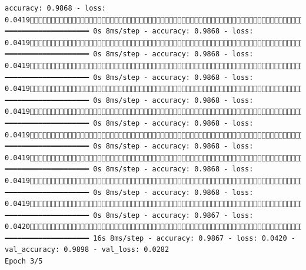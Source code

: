 \documentclass[
  letterpaper,
  DIV=11,
  numbers=noendperiod]{scrreprt}
\begin{document}
\begin{verbatim}
accuracy: 0.9868 - loss: 0.04191824/1875 ━━━━━━━━━━━━━━━━━━━━ 0s 8ms/step - accuracy: 0.9868 - loss: 0.04191830/1875 ━━━━━━━━━━━━━━━━━━━━ 0s 8ms/step - accuracy: 0.9868 - loss: 0.04191836/1875 ━━━━━━━━━━━━━━━━━━━━ 0s 8ms/step - accuracy: 0.9868 - loss: 0.04191842/1875 ━━━━━━━━━━━━━━━━━━━━ 0s 8ms/step - accuracy: 0.9868 - loss: 0.04191848/1875 ━━━━━━━━━━━━━━━━━━━━ 0s 8ms/step - accuracy: 0.9868 - loss: 0.04191854/1875 ━━━━━━━━━━━━━━━━━━━━ 0s 8ms/step - accuracy: 0.9868 - loss: 0.04191860/1875 ━━━━━━━━━━━━━━━━━━━━ 0s 8ms/step - accuracy: 0.9868 - loss: 0.04191866/1875 ━━━━━━━━━━━━━━━━━━━━ 0s 8ms/step - accuracy: 0.9868 - loss: 0.04191872/1875 ━━━━━━━━━━━━━━━━━━━━ 0s 8ms/step - accuracy: 0.9867 - loss: 0.04201875/1875 ━━━━━━━━━━━━━━━━━━━━ 16s 8ms/step - accuracy: 0.9867 - loss: 0.0420 - val_accuracy: 0.9898 - val_loss: 0.0282
Epoch 3/5

\end{verbatim}
\end{document}
